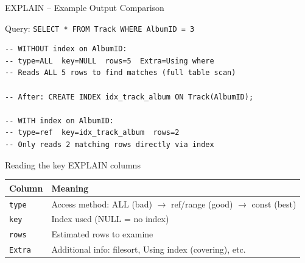 \begin{frame}[fragile]{EXPLAIN -- Example Output Comparison}
  \begin{block}{Query: \texttt{SELECT * FROM Track WHERE AlbumID = 3}}
\begin{lstlisting}[style=sqlstyle]
-- WITHOUT index on AlbumID:
-- type=ALL  key=NULL  rows=5  Extra=Using where
-- Reads ALL 5 rows to find matches (full table scan)

-- After: CREATE INDEX idx_track_album ON Track(AlbumID);

-- WITH index on AlbumID:
-- type=ref  key=idx_track_album  rows=2
-- Only reads 2 matching rows directly via index
\end{lstlisting}
  \end{block}

  \begin{block}{Reading the key EXPLAIN columns}
    \begin{tabular}{@{}ll@{}}
      \toprule
      \textbf{Column} & \textbf{Meaning} \\
      \midrule
      \texttt{type}   & Access method: ALL (bad) $\to$ ref/range (good) $\to$ const (best) \\
      \texttt{key}    & Index used (NULL = no index) \\
      \texttt{rows}   & Estimated rows to examine \\
      \texttt{Extra}  & Additional info: filesort, Using index (covering), etc. \\
      \bottomrule
    \end{tabular}
  \end{block}
\end{frame}
